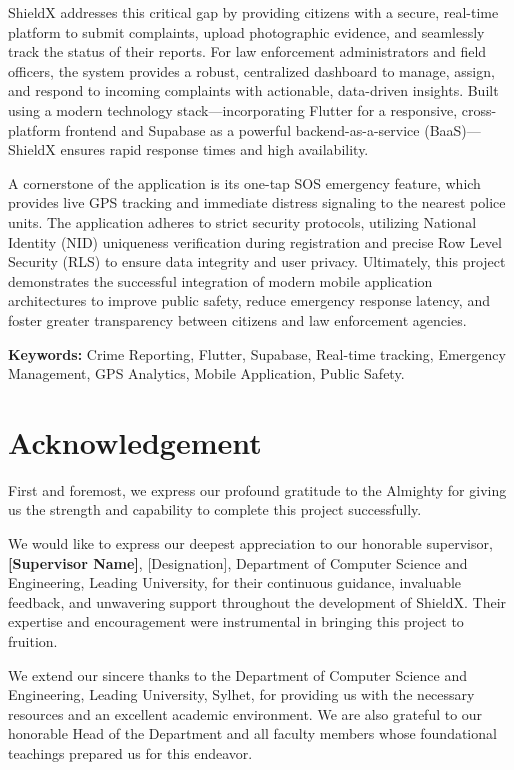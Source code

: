 \documentclass[11pt, a4paper]{report}
\begin{document}
ShieldX addresses this critical gap by providing citizens with a secure, real-time platform to submit complaints, upload photographic evidence, and seamlessly track the status of their reports. For law enforcement administrators and field officers, the system provides a robust, centralized dashboard to manage, assign, and respond to incoming complaints with actionable, data-driven insights. Built using a modern technology stack---incorporating Flutter for a responsive, cross-platform frontend and Supabase as a powerful backend-as-a-service (BaaS)---ShieldX ensures rapid response times and high availability. 

A cornerstone of the application is its one-tap SOS emergency feature, which provides live GPS tracking and immediate distress signaling to the nearest police units. The application adheres to strict security protocols, utilizing National Identity (NID) uniqueness verification during registration and precise Row Level Security (RLS) to ensure data integrity and user privacy. Ultimately, this project demonstrates the successful integration of modern mobile application architectures to improve public safety, reduce emergency response latency, and foster greater transparency between citizens and law enforcement agencies.

\vspace{0.5cm}
\noindent\textbf{Keywords:} Crime Reporting, Flutter, Supabase, Real-time tracking, Emergency Management, GPS Analytics, Mobile Application, Public Safety.

\chapter*{Acknowledgement}
First and foremost, we express our profound gratitude to the Almighty for giving us the strength and capability to complete this project successfully.

We would like to express our deepest appreciation to our honorable supervisor, \textbf{[Supervisor Name]}, [Designation], Department of Computer Science and Engineering, Leading University, for their continuous guidance, invaluable feedback, and unwavering support throughout the development of ShieldX. Their expertise and encouragement were instrumental in bringing this project to fruition.

We extend our sincere thanks to the Department of Computer Science and Engineering, Leading University, Sylhet, for providing us with the necessary resources and an excellent academic environment. We are also grateful to our honorable Head of the Department and all faculty members whose foundational teachings prepared us for this endeavor.
\end{document}
